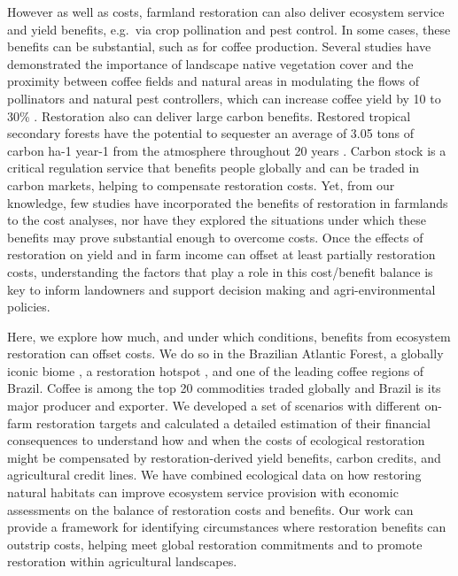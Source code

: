 \documentclass[
	12pt,				%
	oneside,			%
	a4paper,			%
	chapter=TITLE,		%
	section=TITLE,		%
	brazil,			%
	english				%
	]{abntex2}
\begin{document}
However as well as costs, farmland restoration can also deliver ecosystem service and yield benefits, e.g.~via crop pollination and pest control. In some cases, these benefits can be substantial, such as for coffee production. Several studies have demonstrated the importance of landscape native vegetation cover and the proximity between coffee fields and natural areas in modulating the flows of pollinators and natural pest controllers, which can increase coffee yield by 10 to 30\% \autocite{aristizabal_landscape_2019,gonzalez-chaves_forest_2020,libran-embid_effects_2017,ricketts_economic_2004,roubik_value_2002,saturni_landscape_2016,moreaux_value_2022}. Restoration also can deliver large carbon benefits. Restored tropical secondary forests have the potential to sequester an average of 3.05 tons of carbon ha-1 year-1 from the atmosphere throughout 20 years \autocite{poorter_biomass_2016}. Carbon stock is a critical regulation service that benefits people globally and can be traded in carbon markets, helping to compensate restoration costs. Yet, from our knowledge, few studies \autocite{bradbury_economic_2021} have incorporated the benefits of restoration in farmlands to the cost analyses, nor have they explored the situations under which these benefits may prove substantial enough to overcome costs. Once the effects of restoration on yield and in farm income can offset at least partially restoration costs, understanding the factors that play a role in this cost/benefit balance is key to inform landowners and support decision making and agri-environmental policies.

Here, we explore how much, and under which conditions, benefits from ecosystem restoration can offset costs. We do so in the Brazilian Atlantic Forest, a globally iconic biome \autocite{laurance_conserving_2009}, a restoration hotspot \autocite{brancalion_global_2019}, and one of the leading coffee regions of Brazil. Coffee is among the top 20 commodities traded globally \autocite{fao_top_2019} and Brazil is its major producer and exporter. We developed a set of scenarios with different on-farm restoration targets and calculated a detailed estimation of their financial consequences to understand how and when the costs of ecological restoration might be compensated by restoration-derived yield benefits, carbon credits, and agricultural credit lines. We have combined ecological data on how restoring natural habitats can improve ecosystem service provision with economic assessments on the balance of restoration costs and benefits. Our work can provide a framework for identifying circumstances where restoration benefits can outstrip costs, helping meet global restoration commitments and to promote restoration within agricultural landscapes.
\end{document}
